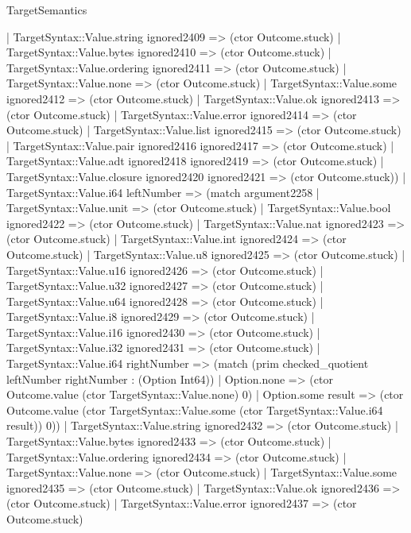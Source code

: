 \begin{lexlean}{TargetSemantics}
\begin{semanticmodule}
{              | TargetSyntax::Value.string ignored2409 => (ctor Outcome.stuck)
              | TargetSyntax::Value.bytes ignored2410 => (ctor Outcome.stuck)
              | TargetSyntax::Value.ordering ignored2411 => (ctor Outcome.stuck)
              | TargetSyntax::Value.none => (ctor Outcome.stuck)
              | TargetSyntax::Value.some ignored2412 => (ctor Outcome.stuck)
              | TargetSyntax::Value.ok ignored2413 => (ctor Outcome.stuck)
              | TargetSyntax::Value.error ignored2414 => (ctor Outcome.stuck)
              | TargetSyntax::Value.list ignored2415 => (ctor Outcome.stuck)
              | TargetSyntax::Value.pair ignored2416 ignored2417 => (ctor Outcome.stuck)
              | TargetSyntax::Value.adt ignored2418 ignored2419 => (ctor Outcome.stuck)
              | TargetSyntax::Value.closure ignored2420 ignored2421 => (ctor Outcome.stuck))
            | TargetSyntax::Value.i64 leftNumber => (match argument2258
              | TargetSyntax::Value.unit => (ctor Outcome.stuck)
              | TargetSyntax::Value.bool ignored2422 => (ctor Outcome.stuck)
              | TargetSyntax::Value.nat ignored2423 => (ctor Outcome.stuck)
              | TargetSyntax::Value.int ignored2424 => (ctor Outcome.stuck)
              | TargetSyntax::Value.u8 ignored2425 => (ctor Outcome.stuck)
              | TargetSyntax::Value.u16 ignored2426 => (ctor Outcome.stuck)
              | TargetSyntax::Value.u32 ignored2427 => (ctor Outcome.stuck)
              | TargetSyntax::Value.u64 ignored2428 => (ctor Outcome.stuck)
              | TargetSyntax::Value.i8 ignored2429 => (ctor Outcome.stuck)
              | TargetSyntax::Value.i16 ignored2430 => (ctor Outcome.stuck)
              | TargetSyntax::Value.i32 ignored2431 => (ctor Outcome.stuck)
              | TargetSyntax::Value.i64 rightNumber => (match (prim checked_quotient leftNumber rightNumber : (Option Int64))
                | Option.none => (ctor Outcome.value (ctor TargetSyntax::Value.none) 0)
                | Option.some result => (ctor Outcome.value (ctor TargetSyntax::Value.some (ctor TargetSyntax::Value.i64 result)) 0))
              | TargetSyntax::Value.string ignored2432 => (ctor Outcome.stuck)
              | TargetSyntax::Value.bytes ignored2433 => (ctor Outcome.stuck)
              | TargetSyntax::Value.ordering ignored2434 => (ctor Outcome.stuck)
              | TargetSyntax::Value.none => (ctor Outcome.stuck)
              | TargetSyntax::Value.some ignored2435 => (ctor Outcome.stuck)
              | TargetSyntax::Value.ok ignored2436 => (ctor Outcome.stuck)
              | TargetSyntax::Value.error ignored2437 => (ctor Outcome.stuck)
}
\end{semanticmodule}
\end{lexlean}
